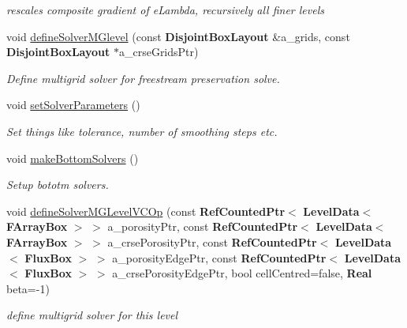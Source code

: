 \begin{DoxyCompactItemize}
\begin{DoxyCompactList}\small\item\em rescales composite gradient of e\+Lambda, recursively all finer levels \end{DoxyCompactList}\item 
void \hyperlink{class_projector_a328920a24092d06892c154a0910a2d81}{define\+Solver\+M\+Glevel} (const \textbf{ Disjoint\+Box\+Layout} \&a\+\_\+grids, const \textbf{ Disjoint\+Box\+Layout} $\ast$a\+\_\+crse\+Grids\+Ptr)
\begin{DoxyCompactList}\small\item\em Define multigrid solver for freestream preservation solve. \end{DoxyCompactList}\item 
\mbox{\label{class_projector_ab83bb9dd2a10772de480eae7c4aac621}} 
void \hyperlink{class_projector_ab83bb9dd2a10772de480eae7c4aac621}{set\+Solver\+Parameters} ()
\begin{DoxyCompactList}\small\item\em Set things like tolerance, number of smoothing steps etc. \end{DoxyCompactList}\item 
\mbox{\label{class_projector_a6111cb6a5efd8c2c514adca89e62371e}} 
void \hyperlink{class_projector_a6111cb6a5efd8c2c514adca89e62371e}{make\+Bottom\+Solvers} ()
\begin{DoxyCompactList}\small\item\em Setup bototm solvers. \end{DoxyCompactList}\item 
void \hyperlink{class_projector_a5640c62724e4682f79997f16012e12f7}{define\+Solver\+M\+G\+Level\+V\+C\+Op} (const \textbf{ Ref\+Counted\+Ptr}$<$ \textbf{ Level\+Data}$<$ \textbf{ F\+Array\+Box} $>$ $>$ a\+\_\+porosity\+Ptr, const \textbf{ Ref\+Counted\+Ptr}$<$ \textbf{ Level\+Data}$<$ \textbf{ F\+Array\+Box} $>$ $>$ a\+\_\+crse\+Porosity\+Ptr, const \textbf{ Ref\+Counted\+Ptr}$<$ \textbf{ Level\+Data}$<$ \textbf{ Flux\+Box} $>$ $>$ a\+\_\+porosity\+Edge\+Ptr, const \textbf{ Ref\+Counted\+Ptr}$<$ \textbf{ Level\+Data}$<$ \textbf{ Flux\+Box} $>$ $>$ a\+\_\+crse\+Porosity\+Edge\+Ptr, bool cell\+Centred=false, \textbf{ Real} beta=-\/1)
\begin{DoxyCompactList}\small\item\em define multigrid solver for this level \end{DoxyCompactList}\item 

\end{DoxyCompactItemize}
